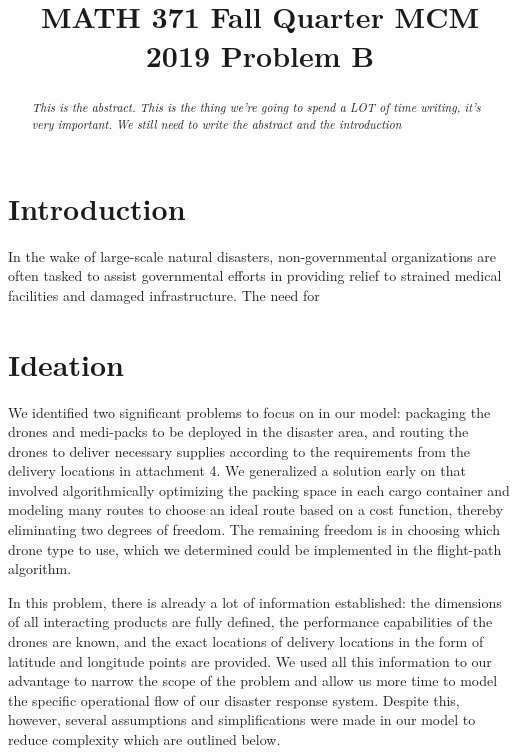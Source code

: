 \documentclass[twocolumn,10pt]{asme2ej}
\title{MATH 371 Fall Quarter MCM 2019 Problem B}
\begin{document}
\maketitle


\begin{abstract}
{\it This is the abstract. This is the thing we're going to spend a LOT of time writing, it's very important. We still need to write the abstract and the introduction
}
\end{abstract}



\section{Introduction}
In the wake of large-scale natural disasters, non-governmental organizations are often tasked to assist governmental efforts in providing relief to strained medical facilities and damaged infrastructure. The need for 

\section{Ideation}
We identified two significant problems to focus on in our model: packaging the drones and medi-packs to be deployed in the disaster area, and routing the drones to deliver necessary supplies according to the requirements from the delivery locations in attachment 4. We generalized a solution early on that involved algorithmically optimizing the packing space in each cargo container and modeling many routes to choose an ideal route based on a cost function, thereby eliminating two degrees of freedom. The remaining freedom is in choosing which drone type to use, which we determined could be implemented in the flight-path algorithm.

In this problem, there is already a lot of information established: the dimensions of all interacting products are fully defined, the performance capabilities of the drones are known, and the exact locations of delivery locations in the form of latitude and longitude points are provided. We used all this information to our advantage to narrow the scope of the problem and allow us more time to model the specific operational flow of our disaster response system. Despite this, however, several assumptions and simplifications were made in our model to reduce complexity which are outlined below.
\end{document}
